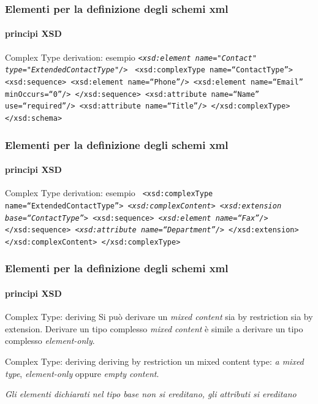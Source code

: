 \begin{frame}
	\frametitle{Elementi per la definizione degli schemi xml}
	\framesubtitle{principi XSD}
	\addtocounter{nframe}{1}

	\begin{block}{Complex Type derivation: esempio}
		\texttt{\emph{<xsd:element name="Contact" type="ExtendedContactType"/>}}
		\texttt{%
			<xsd:complexType name=``ContactType''>
			<xsd:sequence>
			<xsd:element name=``Phone''/>
			<xsd:element name=``Email'' minOccurs=``0''/>
			</xsd:sequence>
			<xsd:attribute name=``Name'' use=``required''/>
			<xsd:attribute name=``Title''/>
			</xsd:complexType>
			</xsd:schema>
		}
	\end{block}
\end{frame}


\begin{frame}
	\frametitle{Elementi per la definizione degli schemi xml}
	\framesubtitle{principi XSD}
	\addtocounter{nframe}{1}

	\begin{block}{Complex Type derivation: esempio}
		\texttt{
			<xsd:complexType name=``ExtendedContactType''>
			\emph{<xsd:complexContent>}
			\emph{<xsd:extension base=``ContactType''>}
			<xsd:sequence>
			\emph{<xsd:element name=``Fax''/>}
			</xsd:sequence>
			\emph{<xsd:attribute name=``Department''/>}
			</xsd:extension>
			</xsd:complexContent>
			</xsd:complexType>
		}
	\end{block}
\end{frame}

\begin{frame}
	\frametitle{Elementi per la definizione degli schemi xml}
	\framesubtitle{principi XSD}
	\addtocounter{nframe}{1}

	\begin{block}{Complex Type: deriving }
		Si può derivare un \textit{mixed content} sia by restriction sia by extension.
		Derivare un tipo complesso \textit{mixed content} è simile a derivare un tipo complesso \textit{element-only}.
	\end{block}

	\begin{block}{Complex Type: deriving}
		 deriving by restriction un mixed content type: \textit{a mixed type}, \textit{element-only} oppure \textit{empty content}. 
	\end{block}
	\textit{Gli elementi dichiarati nel tipo base non si ereditano, gli attributi si ereditano}
\end{frame}


